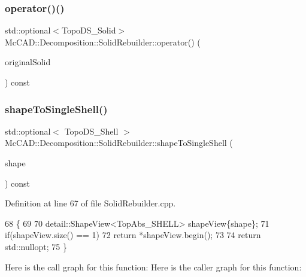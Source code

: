 \subsubsection{\texorpdfstring{operator()()}{operator()()}\hspace{0.1cm}{\footnotesize\ttfamily [2/2]}}
{\footnotesize\ttfamily std\+::optional$<$Topo\+D\+S\+\_\+\+Solid$>$ Mc\+C\+A\+D\+::\+Decomposition\+::\+Solid\+Rebuilder\+::operator() (\begin{DoxyParamCaption}\item[{const Topo\+D\+S\+\_\+\+Solid \&}]{original\+Solid }\end{DoxyParamCaption}) const}

\mbox{\label{classMcCAD_1_1Decomposition_1_1SolidRebuilder_abcbb84bed6ab279e3f5ed3342d439f22}} 
\subsubsection{\texorpdfstring{shape\+To\+Single\+Shell()}{shapeToSingleShell()}\hspace{0.1cm}{\footnotesize\ttfamily [1/2]}}
{\footnotesize\ttfamily std\+::optional$<$ Topo\+D\+S\+\_\+\+Shell $>$ Mc\+C\+A\+D\+::\+Decomposition\+::\+Solid\+Rebuilder\+::shape\+To\+Single\+Shell (\begin{DoxyParamCaption}\item[{const Topo\+D\+S\+\_\+\+Shape \&}]{shape }\end{DoxyParamCaption}) const\hspace{0.3cm}{\ttfamily [private]}}



Definition at line 67 of file Solid\+Rebuilder.\+cpp.


\begin{DoxyCode}
68                                         \{
69 
70     detail::ShapeView<TopAbs\_SHELL> shapeView\{shape\};
71     \textcolor{keywordflow}{if}(shapeView.size() == 1)
72         \textcolor{keywordflow}{return} *shapeView.begin();
73 
74     \textcolor{keywordflow}{return} std::nullopt;
75 \}
\end{DoxyCode}
Here is the call graph for this function\+:
Here is the caller graph for this function\+:
\mbox{\label{classMcCAD_1_1Decomposition_1_1SolidRebuilder_ad85da8e2682f2422a84107b31e9e2681}} 
